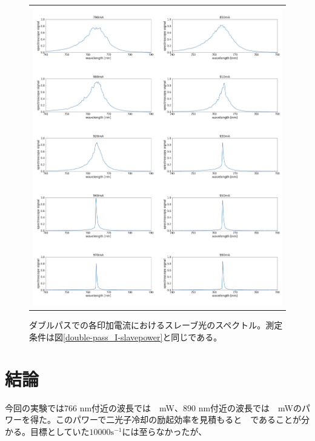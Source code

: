 \documentclass[uplatex, dvipdfmx, a4paper, report, papersize, 11pt]{jsbook}
\begin{document}
\begin{figure}[htpb]
\begin{tabular}{c}
      \begin{minipage}{1\hsize}
        \centering
          \includegraphics[keepaspectratio,  scale=0.340,  angle=0]
                          {figures/chapter4/double-pass-Slave-Spectrum.png}
                          \caption{ダブルパスでの各印加電流におけるスレーブ光のスペクトル。測定条件は図\ref{double-pass_I-slavepower}と同じである。}
                          \label{double-pass_I-Slave}

      \end{minipage}


    \end{tabular}
\end{figure}
\section{結論}

今回の実験では$766$ nm付近の波長では~~mW、$890$ nm付近の波長では~~mWのパワーを得た。このパワーで二光子冷却の励起効率を見積もると~~であることが分かる。目標としていた$10000 \mathrm{s^{-1}}$には至らなかったが、


\end{document}
